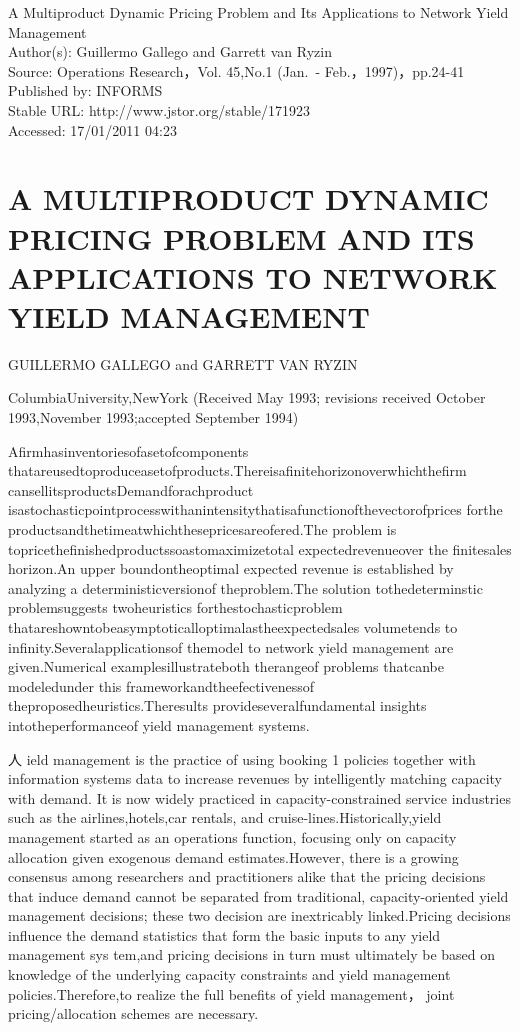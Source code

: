 


A Multiproduct Dynamic Pricing Problem and Its Applications to Network
Yield Management\\
Author(s): Guillermo Gallego and Garrett van Ryzin\\
Source: Operations Research，Vol. 45,No.1 (Jan.~-
Feb.，1997)，pp.24-41\\
Published by: INFORMS\\
Stable URL: http://www.jstor.org/stable/171923\\
Accessed: 17/01/2011 04:23

\section{A MULTIPRODUCT DYNAMIC PRICING PROBLEM AND ITS APPLICATIONS TO
NETWORK YIELD
MANAGEMENT}\label{a-multiproduct-dynamic-pricing-problem-and-its-applications-to-network-yield-management}

GUILLERMO GALLEGO and GARRETT VAN RYZIN

ColumbiaUniversity,NewYork (Received May 1993; revisions received
October 1993,November 1993;accepted September 1994)

Afirmhasinventoriesofasetofcomponents
thatareusedtoproduceasetofproducts.Thereisafinitehorizonoverwhichthefirm
cansellitsproductsDemandforachproduct
isastochasticpointprocesswithanintensitythatisafunctionofthevectorofprices
forthe productsandthetimeatwhichthesepricesareofered.The problem is
topricethefinishedproductssoastomaximizetotal expectedrevenueover the
finitesales horizon.An upper boundontheoptimal expected revenue is
established by analyzing a deterministicversionof theproblem.The
solution tothedeterminstic problemsuggests twoheuristics
forthestochasticproblem
thatareshowntobeasymptoticalloptimalastheexpectedsales volumetends to
infinity.Severalapplicationsof themodel to network yield management are
given.Numerical examplesillustrateboth therangeof problems thatcanbe
modeledunder this frameworkandtheefectivenessof
theproposedheuristics.Theresults provideseveralfundamental insights
intotheperformanceof yield management systems.

人 ield management is the practice of using booking 1 policies together with information systems data to increase revenues by intelligently
matching capacity with demand. It is now widely practiced in capacity-constrained service industries such as the airlines,hotels,car
rentals, and cruise-lines.Historically,yield management started as an
operations function, focusing only on capacity allocation given exogenous demand estimates.However, there is a growing consensus among
researchers and practitioners alike that the pricing decisions that
induce demand cannot be separated from traditional, capacity-oriented
yield management decisions; these two decision are inextricably
linked.Pricing decisions influence the demand statistics that form the
basic inputs to any yield management sys tem,and pricing decisions in
turn must ultimately be based on knowledge of the underlying capacity
constraints and yield management policies.Therefore,to realize the full
benefits of yield management， joint pricing/allocation schemes are
necessary.

